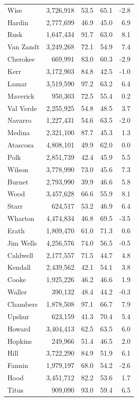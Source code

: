 \documentclass[11pt]{article}
\begin{document}
\begin{longtable}{lrrrr}
Wise & 3,726,918 & 53.5 & 65.1 & -2.8 \\
Hardin & 2,777,699 & 46.9 & 45.0 & 6.9 \\
Rusk & 1,647,434 & 91.7 & 63.0 & 8.1 \\
Van Zandt & 3,249,268 & 72.1 & 54.9 & 7.4 \\
Cherokee & 669,991 & 83.0 & 60.3 & -2.9 \\
Kerr & 3,172,903 & 84.8 & 42.5 & -1.0 \\
Lamar & 3,519,590 & 97.2 & 63.2 & 6.4 \\
Maverick & 950,303 & 72.5 & 55.4 & 0.2 \\
Val Verde & 2,255,925 & 54.8 & 48.5 & 3.7 \\
Navarro & 1,227,431 & 54.6 & 63.5 & -2.0 \\
Medina & 2,321,100 & 87.7 & 45.3 & 1.3 \\
Atascosa & 4,808,101 & 49.9 & 62.0 & 0.0 \\
Polk & 2,851,739 & 42.4 & 45.9 & 5.5 \\
Wilson & 3,778,990 & 73.0 & 45.6 & 7.3 \\
Burnet & 2,793,990 & 39.9 & 46.6 & 5.8 \\
Wood & 3,457,628 & 66.6 & 55.9 & 8.1 \\
Starr & 624,517 & 53.2 & 46.9 & 6.4 \\
Wharton & 4,474,834 & 46.8 & 69.5 & -3.5 \\
Erath & 1,809,470 & 61.0 & 71.3 & 0.6 \\
Jim Wells & 4,256,576 & 74.0 & 56.5 & -0.5 \\
Caldwell & 2,177,557 & 71.5 & 44.7 & 4.8 \\
Kendall & 2,439,562 & 42.1 & 54.1 & 3.8 \\
Cooke & 1,925,226 & 46.2 & 46.6 & 1.9 \\
Waller & 390,132 & 48.4 & 44.2 & -0.3 \\
Chambers & 1,878,508 & 97.1 & 66.7 & 7.9 \\
Upshur & 623,159 & 41.3 & 70.4 & 5.4 \\
Howard & 3,404,413 & 62.5 & 63.5 & 6.0 \\
Hopkins & 249,966 & 51.4 & 46.5 & 2.0 \\
Hill & 3,722,290 & 84.9 & 51.9 & 6.1 \\
Fannin & 1,979,197 & 68.0 & 54.2 & -2.6 \\
Hood & 3,451,712 & 82.2 & 53.6 & 1.7 \\
Titus & 909,090 & 93.0 & 59.4 & 6.5 \\

\end{longtable}
\end{document}
